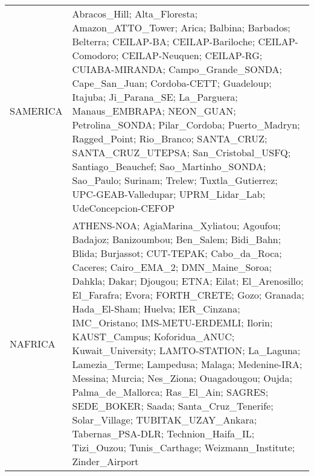 \documentclass[journal abbreviation, manuscript]{copernicus}
\begin{document}
\begin{table}
\begin{tabularx}{\textwidth}{lX}
  SAMERICA  & Abracos\_Hill; Alta\_Floresta; Amazon\_ATTO\_Tower; Arica; Balbina; Barbados; Belterra; CEILAP-BA; CEILAP-Bariloche; CEILAP-Comodoro; CEILAP-Neuquen; CEILAP-RG; CUIABA-MIRANDA; Campo\_Grande\_SONDA; Cape\_San\_Juan; Cordoba-CETT; Guadeloup; Itajuba; Ji\_Parana\_SE; La\_Parguera; Manaus\_EMBRAPA; NEON\_GUAN; Petrolina\_SONDA; Pilar\_Cordoba; Puerto\_Madryn; Ragged\_Point; Rio\_Branco; SANTA\_CRUZ; SANTA\_CRUZ\_UTEPSA; San\_Cristobal\_USFQ; Santiago\_Beauchef; Sao\_Martinho\_SONDA; Sao\_Paulo; Surinam; Trelew; Tuxtla\_Gutierrez; UPC-GEAB-Valledupar; UPRM\_Lidar\_Lab; UdeConcepcion-CEFOP                                                                                                                                                                                                                                                                                                                                                                                                                                                                                                                                                                                                                                                                                                                                                                                                                                               \\
  NAFRICA   & ATHENS-NOA; AgiaMarina\_Xyliatou; Agoufou; Badajoz; Banizoumbou; Ben\_Salem; Bidi\_Bahn; Blida; Burjassot; CUT-TEPAK; Cabo\_da\_Roca; Caceres; Cairo\_EMA\_2; DMN\_Maine\_Soroa; Dahkla; Dakar; Djougou; ETNA; Eilat; El\_Arenosillo; El\_Farafra; Evora; FORTH\_CRETE; Gozo; Granada; Hada\_El-Sham; Huelva; IER\_Cinzana; IMC\_Oristano; IMS-METU-ERDEMLI; Ilorin; KAUST\_Campus; Koforidua\_ANUC; Kuwait\_University; LAMTO-STATION; La\_Laguna; Lamezia\_Terme; Lampedusa; Malaga; Medenine-IRA; Messina; Murcia; Nes\_Ziona; Ouagadougou; Oujda; Palma\_de\_Mallorca; Ras\_El\_Ain; SAGRES; SEDE\_BOKER; Saada; Santa\_Cruz\_Tenerife; Solar\_Village; TUBITAK\_UZAY\_Ankara; Tabernas\_PSA-DLR; Technion\_Haifa\_IL; Tizi\_Ouzou; Tunis\_Carthage; Weizmann\_Institute; Zinder\_Airport                                                                                                                                                                                                                                                                                                                                                                                                                                                                                                                                                                                                                                                                 \\

\end{tabularx}
\end{table}
\end{document}
